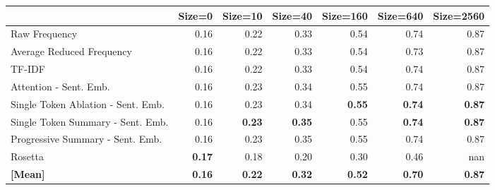 \begin{tabular}{lrrrrrr}
\toprule
 & Size=0 & Size=10 & Size=40 & Size=160 & Size=640 & Size=2560 \\
\midrule
Raw Frequency & \cellcolor[RGB]{58,76,192}0.16 & \cellcolor[RGB]{82,110,220}0.22 & \cellcolor[RGB]{134,169,252}0.33 & \cellcolor[RGB]{229,216,208}0.54 & \cellcolor[RGB]{236,128,100}0.74 & \cellcolor[RGB]{179,3,38}0.87 \\
Average Reduced Frequency & \cellcolor[RGB]{58,76,192}0.16 & \cellcolor[RGB]{82,110,220}0.22 & \cellcolor[RGB]{134,169,252}0.33 & \cellcolor[RGB]{229,216,208}0.54 & \cellcolor[RGB]{236,130,102}0.73 & \cellcolor[RGB]{179,3,38}0.87 \\
TF-IDF & \cellcolor[RGB]{58,76,192}0.16 & \cellcolor[RGB]{82,110,220}0.22 & \cellcolor[RGB]{137,172,252}0.33 & \cellcolor[RGB]{229,216,208}0.54 & \cellcolor[RGB]{235,127,99}0.74 & \cellcolor[RGB]{179,3,38}0.87 \\
Attention - Sent. Emb. & \cellcolor[RGB]{58,76,192}0.16 & \cellcolor[RGB]{86,115,224}0.23 & \cellcolor[RGB]{141,175,253}0.34 & \cellcolor[RGB]{231,214,205}0.55 & \cellcolor[RGB]{236,128,100}0.74 & \cellcolor[RGB]{181,8,39}0.87 \\
Single Token Ablation - Sent. Emb. & \cellcolor[RGB]{58,76,192}0.16 & \cellcolor[RGB]{87,117,225}0.23 & \cellcolor[RGB]{141,175,253}0.34 & \cellcolor[RGB]{233,212,201}\textbf{0.55} & \cellcolor[RGB]{234,125,97}\textbf{0.74} & \cellcolor[RGB]{179,3,38}\textbf{0.87} \\
Single Token Summary - Sent. Emb. & \cellcolor[RGB]{58,76,192}0.16 & \cellcolor[RGB]{90,120,227}\textbf{0.23} & \cellcolor[RGB]{145,179,254}\textbf{0.35} & \cellcolor[RGB]{232,213,202}0.55 & \cellcolor[RGB]{234,125,97}\textbf{0.74} & \cellcolor[RGB]{179,3,38}\textbf{0.87} \\
Progressive Summary - Sent. Emb. & \cellcolor[RGB]{58,76,192}0.16 & \cellcolor[RGB]{87,117,225}0.23 & \cellcolor[RGB]{144,178,254}0.35 & \cellcolor[RGB]{232,213,202}0.55 & \cellcolor[RGB]{235,127,99}0.74 & \cellcolor[RGB]{181,8,39}0.87 \\
Rosetta & \cellcolor[RGB]{59,77,193}\textbf{0.17} & \cellcolor[RGB]{65,86,201}0.18 & \cellcolor[RGB]{73,98,211}0.20 & \cellcolor[RGB]{123,158,248}0.30 & \cellcolor[RGB]{197,213,242}0.46 & \cellcolor[RGB]{0,0,0}nan \\
\midrule 
\textbf{[Mean]} & \textbf{0.16} & \textbf{0.22} & \textbf{0.32} & \textbf{0.52} & \textbf{0.70} & \textbf{0.87} \\
\bottomrule
\end{tabular}